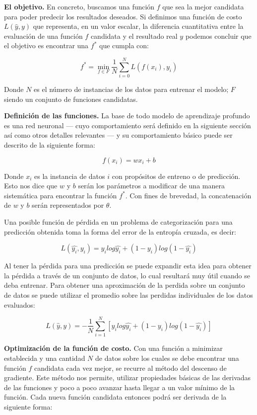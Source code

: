 \textbf{El objetivo.} En concreto, buscamos una función $f$ que sea la mejor candidata para poder predecir los resultados deseados. Si definimos una función de costo $L(\hat{y}, y)$ que representa, en un valor escalar, la diferencia cuantitativa entre la evaluación de una función $f$ candidata y el resultado real $y$ podemos concluir que el objetivo es encontrar una $f^*$ que cumpla con:

\[ f^* = \min_{f \in F} \frac{1}{N} \sum_{i = 0}^{N} L(f(x_i), y_i) \]

Donde $N$ es el número de instancias de los datos para entrenar el modelo; $F$ siendo un conjunto de funciones candidatas.

\textbf{Definición de las funciones.} La base de todo modelo de aprendizaje profundo es una red neuronal --- cuyo comportamiento será definido en la siguiente sección así como otros detalles relevantes --- y su comportamiento básico puede ser descrito de la siguiente forma:

\[ f(x_i) = w x_i + b \]

Donde $x_i$ es la instancia de datos $i$ con propósitos de entreno o de predicción. Esto nos dice que $w$ y $b$ serán los parámetros a modificar de una manera sistemática para encontrar la función $f^*$. Con fines de brevedad, la concatenación de $w$ y $b$ serán representados por $\theta$.

Una posible función de pérdida en un problema de categorización para una predicción obtenida toma la forma del error de la entropía cruzada, es decir:

\[ L(\hat{y_i}, y_i) = y_i log\hat{y_i} + (1 - y_i)log(1 - \hat{y_i}) \]

Al tener la pérdida para una predicción se puede expandir esta idea para obtener la pérdida a través de un conjunto de datos, lo cual resultará muy útil cuando se deba entrenar. Para obtener una aproximación de la perdida sobre un conjunto de datos se puede utilizar el promedio sobre las perdidas individuales de los datos evaluados:

\[ L(\hat{y}, y) = - \frac{1}{N} \sum_{i = 1}^{N} [y_i log\hat{y_i} + (1 - y_i)log(1 - \hat{y_i})] \]

\textbf{Optimización de la función de costo.} Con una función a minimizar establecida y una cantidad $N$ de datos sobre los cuales se debe encontrar una función $f$ candidata cada vez mejor, se recurre al método del descenso de gradiente. Este método nos permite, utilizar propiedades básicas de las derivadas de las funciones y poco a poco avanzar hasta llegar a un valor mínimo de la función. Cada nueva función candidata entonces podrá ser derivada de la siguiente forma:

